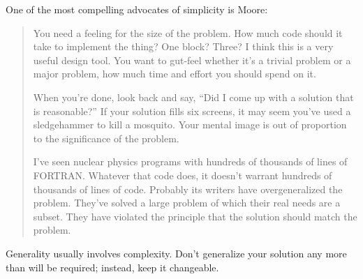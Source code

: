 \blackline{2ex}
\noindent One of the most compelling advocates of simplicity is Moore:

\begin{quotation}
\noindent You need a feeling for the size of the problem. How much code should it
take to implement the thing? One block? Three? I think this is a very useful
design tool. You want to gut-feel whether it's a trivial problem or a major
problem, how much time and effort you should spend on it.

When you're done, look back and say, ``Did I come up with a solution that is
reasonable?'' If your solution fills six screens, it may seem you've used a
sledgehammer to kill a mosquito. Your mental image is out of proportion to
the significance of the problem.

I've seen nuclear physics programs with hundreds of thousands of lines of
FORTRAN. Whatever that code does, it doesn't warrant hundreds of
thousands of lines of code. Probably its writers have overgeneralized the
problem. They've solved a large problem of which their real needs are a
subset. They have violated the principle that the solution should match the
problem.
\end{quotation}
\blackline{2ex}

\begin{tip}
Generality usually involves complexity. Don't generalize your solution any
more than will be required; instead, keep it changeable.
\end{tip}

